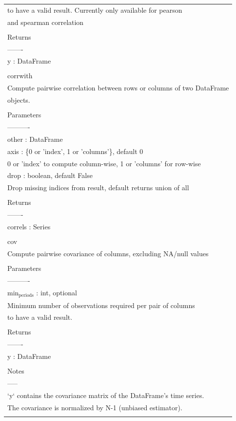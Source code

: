 \documentclass[11pt]{article}
\begin{document}
\begin{enumerate}
\begin{enumerate}
\begin{enumerate}
\begin{center}
\begin{tabular}{l}
to have a valid result. Currently only available for pearson\\
and spearman correlation\\
\\
Returns\\
-------\\
y : DataFrame\\
\\
corrwith\\
Compute pairwise correlation between rows or columns of two DataFrame\\
objects.\\
\\
Parameters\\
----------\\
other : DataFrame\\
axis : \{0 or 'index', 1 or 'columns'\}, default 0\\
0 or 'index' to compute column-wise, 1 or 'columns' for row-wise\\
drop : boolean, default False\\
Drop missing indices from result, default returns union of all\\
\\
Returns\\
-------\\
correls : Series\\
\\
cov\\
Compute pairwise covariance of columns, excluding NA/null values\\
\\
Parameters\\
----------\\
min\(_{\text{periods}}\) : int, optional\\
Minimum number of observations required per pair of columns\\
to have a valid result.\\
\\
Returns\\
-------\\
y : DataFrame\\
\\
Notes\\
-----\\
`y` contains the covariance matrix of the DataFrame's time series.\\
The covariance is normalized by N-1 (unbiased estimator).\\
\\

\end{tabular}
\end{center}
\end{enumerate}
\end{enumerate}
\end{enumerate}
\end{document}
